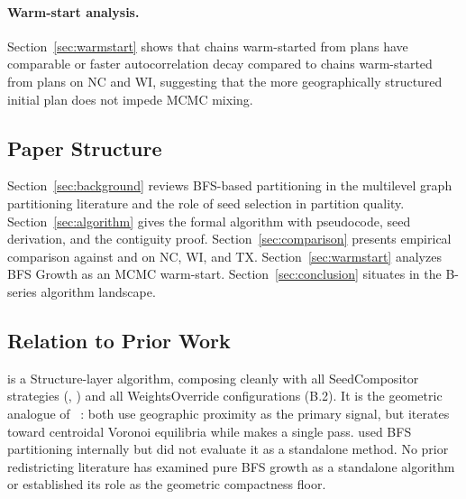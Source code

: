 \paragraph{Warm-start analysis.}
Section~\ref{sec:warmstart} shows that \recom{} chains warm-started from
\bfsg{} plans have comparable or faster autocorrelation decay compared
to chains warm-started from \metis{} plans on NC and WI,
suggesting that the more geographically structured initial plan does not
impede MCMC mixing.

\subsection{Paper Structure}

Section~\ref{sec:background} reviews BFS-based partitioning in the
multilevel graph partitioning literature and the role of seed selection
in partition quality.
Section~\ref{sec:algorithm} gives the formal \bfsg{} algorithm with
pseudocode, seed derivation, and the contiguity proof.
Section~\ref{sec:comparison} presents empirical comparison against \metis{}
and \cvd{} on NC, WI, and TX.
Section~\ref{sec:warmstart} analyzes BFS Growth as an MCMC warm-start.
Section~\ref{sec:conclusion} situates \bfsg{} in the B-series algorithm
landscape.

\subsection{Relation to Prior Work}

\bfsg{} is a Structure-layer algorithm, composing cleanly with all
SeedCompositor strategies (\cs{}, \be{}) and all WeightsOverride
configurations (B.2).
It is the geometric analogue of \cvd{}~\citep{b22paper}: both use
geographic proximity as the primary signal, but \cvd{} iterates toward
centroidal Voronoi equilibria while \bfsg{} makes a single pass.
\citet{karypis1998} used BFS partitioning internally but did not
evaluate it as a standalone method.
No prior redistricting literature has examined pure BFS growth as a
standalone algorithm or established its role as the geometric
compactness floor.
